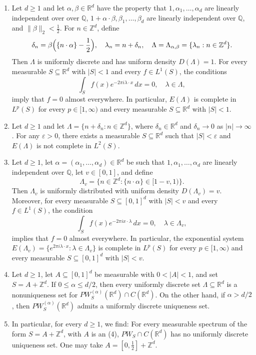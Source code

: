 \documentclass[reqno,a4paper,12pt]{amsart}
\numberwithin{equation}{section}
\def\Z{{\mathbb Z}}
\def\R{{\mathbb R}}
\def\Q{{\mathbb Q}}
\newcommand{\Rd}{{\R^d}}
\newcommand\1{\mathds{1}}
\begin{document}
\begin{enumerate}
    \item Let $d\geq1$ and let $\alpha,\beta\in\Rd$ have the property that $1,\alpha_1,\dots,\alpha_d$ are linearly independent over over $\Q$,  $1+\alpha\cdot\beta,\beta_1,\dots,\beta_d$ are linearly independent over $\Q$, and $\|\beta\|_2<\tfrac12$.
For $n\in\Z^d$, define
\[
 \delta_n=\beta\Bigl(\{n\cdot\alpha\}-\frac12\Bigr),
 \quad
 \lambda_n=n+\delta_n,
 \quad
 \Lambda=\Lambda_{\alpha,\beta}=\{\lambda_n:n\in\Z^d\}.
\]
Then $\Lambda$ is uniformly discrete and has uniform density $D(\Lambda)=1$. For every measurable $S\subseteq\Rd$ with $|S|<1$ and every
$f\in L^1(S)$, the conditions
\[
 \int_S f(x)e^{-2\pi i\lambda\cdot x}\,dx=0,
 \quad\lambda\in\Lambda,
\]
imply that $f=0$ almost everywhere.  In particular, $E(\Lambda)$ is
complete in $L^p(S)$ for every $p\in[1,\infty)$ and every measurable
$S\subseteq\Rd$ with $|S|<1$.
\item Let $d\geq1$ and let $\Lambda=\{n+\delta_n:n\in\Z^d\}$, where
$\delta_n\in\Rd$ and $\delta_n\to0$ as $|n|\to\infty$.  For any
$\varepsilon>0$, there exists a measurable $S\subseteq\Rd$ such that
$|S|<\varepsilon$ and $E(\Lambda)$ is not complete in $L^2(S)$.
\item Let $d\geq1$, let $\alpha=(\alpha_1,\dots,\alpha_d)\in\Rd$ be such that
$1,\alpha_1,\dots,\alpha_d$ are linearly independent over $\Q$, let
$v\in[0,1]$, and define
\[
 \Lambda_v=\{n\in\Z^d:\{n\cdot\alpha\}\in[1-v,1)\}.
\]
Then $\Lambda_v$ is uniformly distributed with uniform density $D(\Lambda_v) = v$.
Moreover, for every measurable
$S\subseteq[0,1]^d$ with $|S|<v$ and every $f\in L^1(S)$, the
condition
\[
 \int_S f(x)e^{-2\pi ix\cdot\lambda}\,dx=0,
 \quad\lambda\in\Lambda_v,
\]
implies that $f=0$ almost everywhere.  In particular, the exponential
system $E(\Lambda_v)=\{e^{2\pi i\lambda\cdot x}:\lambda\in\Lambda_v\}$
is complete in $L^p(S)$ for every $p\in[1,\infty)$ and every
measurable $S\subseteq[0,1]^d$ with $|S|<v$.
\item Let $d\geq1$, let $A\subseteq[0,1]^d$ be measurable with $0<|A|<1$,
and set $S=A+\Z^d$.  If $0\leq\alpha\leq d/2$, then every uniformly
discrete set $\Lambda\subseteq\Rd$ is a nonuniqueness set for
$PW^{(\alpha)}_S(\Rd)\cap C(\Rd)$. On the other hand, if $\alpha > d/2$, then $PW^{(\alpha)}_S(\Rd)$ admits a uniformly discrete uniqueness set.
\item 
In particular, for every $d\geq1$, we find: For every measurable spectrum of the form
$S=A+\Z^d$, with $A$ is an (4), $PW_S\cap C(\Rd)$ has no
uniformly discrete uniqueness set. One may take $A=[0,\tfrac12]+\Z^d$.
\end{enumerate}
\end{document}

